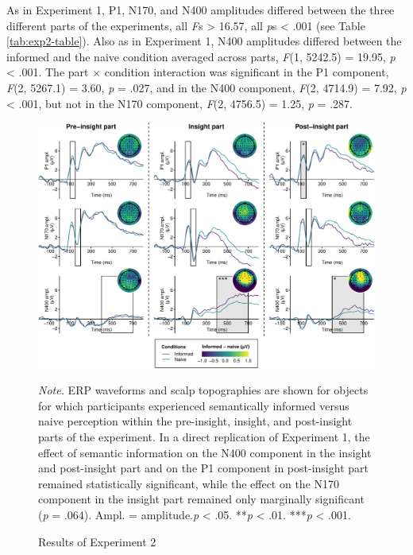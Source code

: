 \documentclass[
  english,
  doc,12pt,twoside,floatsintext]{apa7}
\begin{document}
As in Experiment 1, P1, N170, and N400 amplitudes differed between the three different parts of the experiments, all \emph{F}s \textgreater{} 16.57, all \emph{p}s \textless{} .001 (see Table \ref{tab:exp2-table}). Also as in Experiment 1, N400 amplitudes differed between the informed and the naive condition averaged across parts, \emph{F}(1, 5242.5) = 19.95, \emph{p} \textless{} .001. The part × condition interaction was significant in the P1 component, \emph{F}(2, 5267.1) = 3.60, \emph{p} = .027, and in the N400 component, \emph{F}(2, 4714.9) = 7.92, \emph{p} \textless{} .001, but not in the N170 component, \emph{F}(2, 4756.5) = 1.25, \emph{p} = .287.



\begin{figure}

\caption{Results of Experiment 2\smallskip}\label{fig:exp2-plot}

{\centering \includegraphics[width=1\linewidth]{master_thesis_files/figure-latex/exp2-plot-1} 

}

\bigskip\small\emph{Note.} 
ERP waveforms and scalp topographies are shown for objects for which participants experienced semantically informed versus naive perception within the pre-insight, insight, and post-insight parts of the experiment. In a direct replication of Experiment 1, the effect of semantic information on the N400 component in the insight and post-insight part and on the P1 component in post-insight part remained statistically significant, while the effect on the N170 component in the insight part remained only marginally significant (\emph{p} = .064). Ampl. = amplitude.\newline*\emph{p} \textless{} .05. **\emph{p} \textless{} .01. ***\emph{p} \textless{} .001.

\end{figure}
\end{document}
